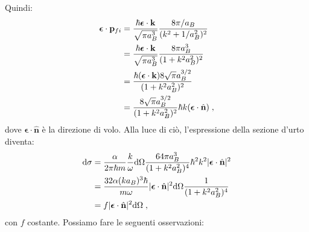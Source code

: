 \documentclass[12pt,a4paper]{report}
\theoremstyle{definition}
\numberwithin{equation}{section}
\newcommand{\diff}[1][]{\mathrm{d}#1}
\begin{document}
Quindi:
\begin{align}
\boldsymbol{\epsilon}\cdot\mathbf{p}_{fi} &= \frac{\hbar\boldsymbol{\epsilon}\cdot\mathbf{k}}{\sqrt{\pi a_B^3}}\frac{8\pi/a_B}{(k^2+1/a_B^2)^2} \notag \\
&= \frac{\hbar\boldsymbol{\epsilon}\cdot\mathbf{k}}{\sqrt{\pi a_B^3}}\frac{8\pi a_B^3}{(1+k^2a_B^2)^2} \notag \\
&= \frac{\hbar(\boldsymbol{\epsilon}\cdot\mathbf{k})8\sqrt{\pi}a_B^{3/2}}{(1+k^2a_B^2)^2} \notag \\
&=\frac{8\sqrt{\pi}a_B^{3/2}}{(1+k^2a_B^2)^2}\hbar k(\boldsymbol{\epsilon}\cdot\hat{\mathbf{n}})\;,
\end{align}
dove $\boldsymbol{\epsilon}\cdot\hat{\mathbf{n}}$ è la direzione di volo. Alla luce di ciò, l'espressione della sezione d'urto diventa:
\begin{align}
\diff{\sigma} &= \frac{\alpha}{2\pi\hbar m}\frac{k}{\omega}\diff{\Omega}\frac{64\pi a_B^3}{(1+k^2a_B^2)^4}\hbar^2k^2|\boldsymbol{\epsilon}\cdot\hat{\mathbf{n}}|^2 \notag \\
&= \frac{32\alpha (ka_B)^3\hbar}{m\omega}|\boldsymbol{\epsilon}\cdot\hat{\mathbf{n}}|^2\diff{\Omega}\frac{1}{(1+k^2a_B^2)^4} \notag \\
&= f|\boldsymbol{\epsilon}\cdot\hat{\mathbf{n}}|^2\diff{\Omega}\;,
\end{align}
con $f$ costante. Possiamo fare le seguenti osservazioni:
\end{document}
